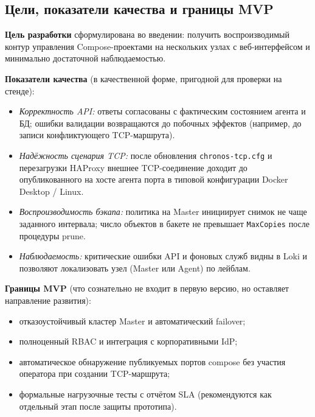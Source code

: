 \subsection{Цели, показатели качества и границы MVP}

\textbf{Цель разработки} сформулирована во введении: получить воспроизводимый контур управления Compose-проектами на нескольких узлах с веб-интерфейсом и минимально достаточной наблюдаемостью.

\textbf{Показатели качества} (в качественной форме, пригодной для проверки на стенде):
\begin{itemize}[leftmargin=1.5cm]
  \item \emph{Корректность API:} ответы согласованы с фактическим состоянием агента и БД; ошибки валидации возвращаются до побочных эффектов (например, до записи конфликтующего TCP-маршрута).
  \item \emph{Надёжность сценария TCP:} после обновления \texttt{chronos-tcp.cfg} и перезагрузки HAProxy внешнее TCP-соединение доходит до опубликованного на хосте агента порта в типовой конфигурации Docker Desktop / Linux.
  \item \emph{Воспроизводимость бэкапа:} политика на Master инициирует снимок не чаще заданного интервала; число объектов в бакете не превышает \texttt{MaxCopies} после процедуры prune.
  \item \emph{Наблюдаемость:} критические ошибки API и фоновых служб видны в Loki и позволяют локализовать узел (Master или Agent) по лейблам.
\end{itemize}

\textbf{Границы MVP} (что сознательно не входит в первую версию, но оставляет направление развития):
\begin{itemize}[leftmargin=1.5cm]
  \item отказоустойчивый кластер Master и автоматический failover;
  \item полноценный RBAC и интеграция с корпоративными IdP;
  \item автоматическое обнаружение публикуемых портов compose без участия оператора при создании TCP-маршрута;
  \item формальные нагрузочные тесты с отчётом SLA (рекомендуются как отдельный этап после защиты прототипа).
\end{itemize}
